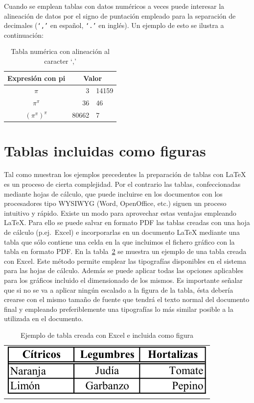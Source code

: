 \documentclass[11pt,a4paper]{article}
\begin{document}
Cuando se emplean tablas con datos numéricos a veces puede interesar la alineación de datos por el signo de puntación empleado para la separación de decimales (\texttt{`,'} en español, \texttt{`.'} en inglés). Un ejemplo de esto se ilustra a continuación:

\begin{table}[hbt]%
	\centering
	\caption{Tabla numérica con alineación al caracter `,'}
	\label{tab:alineada}
	\begin{tabular}{c r@{,} l}
	Expresión con pi & \multicolumn{2}{c}{Valor} \\
	\hline
	$\pi$                   &      3 & 14159 \\
	$\pi^{\pi}$             & 36     &    46 \\
	$(\pi^{\pi})^{\pi}$     &  80662 & 7     \\
	\end{tabular}
\end{table}


\newpage
\section{Tablas incluidas como figuras}
Tal como muestran los ejemplos precedentes la preparación de tablas con \LaTeX{} es un proceso de cierta complejidad. Por el contrario las tablas, confeccionadas mediante hojas de cálculo, que puede incluirse en los documentos con los procesadores tipo WYSIWYG (Word, OpenOffice, etc.) siguen un proceso intuitivo y rápido. Existe un modo para aprovechar estas ventajas empleando \LaTeX{}. Para ello se puede salvar en formato PDF las tablas creadas con una hoja de cálculo (p.ej.\ \textsf{Excel}) e incorporarlas en un documento \LaTeX{} mediante una tabla que sólo contiene una celda en la que incluimos el fichero gráfico con la tabla en formato PDF. En la tabla~\ref{tab:figura} se muestra un ejemplo de una tabla creada con \textsf{Excel}. Este método permite emplear las tipografías disponibles en el sistema para las hojas de cálculo. Además se puede aplicar todas las opciones aplicables para los gráficos incluido el dimensionado de los mismos. Es importante señalar que si no se va a aplicar ningún escalado a la figura de la tabla, ésta debería crearse con el mismo tamaño de fuente que tendrá el texto normal del documento final y empleando preferiblemente una tipografías lo más similar posible a la utilizada en el documento.

\begin{table}[hbt]%
	\centering
	\caption[Tabla \textsf{Excel}]{Ejemplo de tabla creada con \textsf{Excel} e incluida como figura}
	\label{tab:figura}
	\begin{tabular}{c}
		\includegraphics{alimentos}
	\end{tabular}
\end{table}
\end{document}
